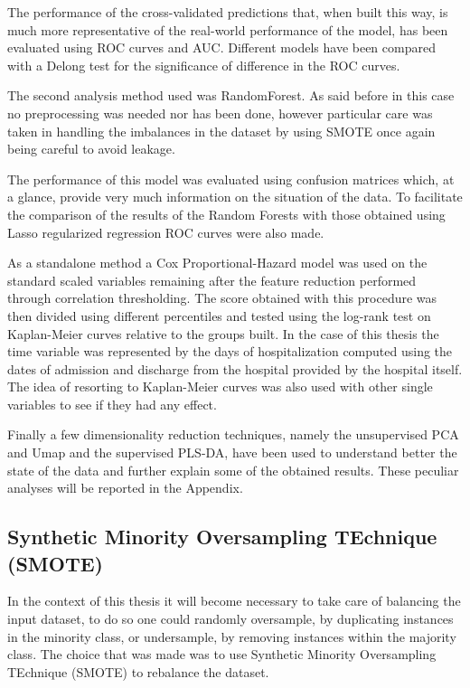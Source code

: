 The performance of the cross-validated predictions that, when built this way, is much more representative of the real-world performance of the model, has been evaluated using ROC curves and AUC.
Different models have been compared with a Delong test\cite{Delong} for the significance of difference in the ROC curves.

The second analysis method used was RandomForest. As said before in this case no preprocessing was needed nor has been done, however particular care was taken in handling the imbalances in the dataset by using SMOTE \cite{SMOTE} once again being careful to avoid leakage. 

The performance of this model was evaluated using confusion matrices which, at a glance, provide very much information on the situation of the data.
To facilitate the comparison of the results of the Random Forests with those obtained using Lasso regularized regression ROC curves were also made.

As a standalone method a Cox Proportional-Hazard model was used on the standard scaled variables remaining after the feature reduction performed through correlation thresholding. 
The score obtained with this procedure was then divided using different percentiles and tested using the log-rank test on Kaplan-Meier curves relative to the groups built.
In the case of this thesis the time variable was represented by the days of hospitalization computed using the dates of admission and discharge from the hospital provided by the hospital itself.
The idea of resorting to Kaplan-Meier curves was also used with other single variables to see if they had any effect. 

Finally a few dimensionality reduction techniques, namely the unsupervised PCA\cite{PCA} and Umap \cite{UMAP} and the supervised PLS-DA\cite{PLSDA}, have been used to understand better the state of the data and further explain some of the obtained results.
These peculiar analyses will be reported in the Appendix.

\subsection{Synthetic Minority Oversampling TEchnique (SMOTE)}
In the context of this thesis it will become necessary to take care of balancing the input dataset, to do so one could randomly oversample, by duplicating instances in the minority class, or undersample, by removing instances within the majority class. The choice that was made was to use Synthetic Minority Oversampling TEchnique (SMOTE)\cite{SMOTE} to rebalance the dataset.

